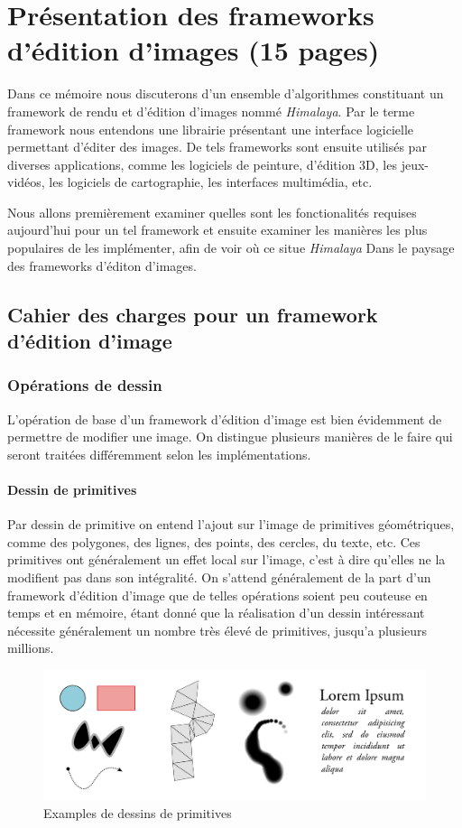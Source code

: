 \chapter{Présentation des frameworks d'édition d'images (15 pages) }
	
	Dans ce mémoire nous discuterons d'un ensemble d'algorithmes constituant un framework
	de rendu et d'édition d'images nommé \emph{Himalaya}. Par le terme framework nous entendons une
	librairie présentant une interface logicielle permettant d'éditer des images.  De tels frameworks sont
	ensuite utilisés par diverses applications, comme les logiciels de peinture, d'édition 3D, les jeux-vidéos,
	les logiciels de cartographie, les interfaces multimédia, etc. 
	
	Nous allons premièrement examiner quelles sont les fonctionalités requises aujourd'hui pour un tel framework 
	et ensuite examiner les manières les plus populaires de les implémenter, afin de voir où ce situe \emph{Himalaya}
	Dans le paysage des frameworks d'éditon d'images.

	\section{Cahier des charges pour un framework d'édition d'image}
		\subsection{Opérations de dessin}
			L'opération de base d'un framework d'édition d'image est bien évidemment de permettre de 
			modifier une image. On distingue plusieurs manières de le faire qui seront traitées différemment
			selon les implémentations.
			\subsubsection{Dessin de primitives}
				Par dessin de primitive on entend l'ajout sur l'image de primitives géométriques, comme
				des polygones, des lignes, des points, des cercles, du texte, etc. Ces primitives ont généralement un 
				effet local sur l'image, c'est à dire qu'elles ne la modifient pas dans son intégralité. On s'attend généralement
				de la part d'un framework d'édition d'image que de telles opérations soient peu couteuse en
				temps et en mémoire, étant donné que la réalisation d'un dessin intéressant nécessite généralement
				un nombre très élevé de primitives, jusqu'a plusieurs millions.
				\begin{figure}[h]
					\centering
					\includegraphics[width=\textwidth]{images/primitives}
					\caption{Examples de dessins de primitives}
					\label{fig:primitives}
				\end{figure}
